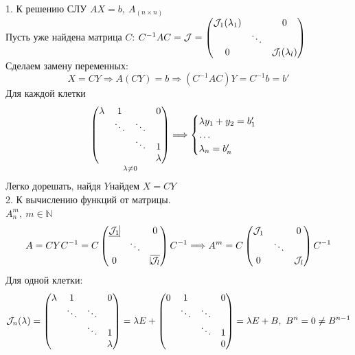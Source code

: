 \documentclass[a4paper, 12pt]{article}
\theoremstyle{definition}
\begin{document}
    1. К решению СЛУ $AX = b,\ A_{(n\times n)}$\\
    Пусть уже найдена матрица $C$: $C^{-1}AC = \mathcal{J} =
    \begin{pmatrix}
        \mathcal{J}_1(\lambda_1) & \null & 0\\
        \null & \ddots & \null\\
        0 & \null & \mathcal{J}_l(\lambda_l) 
    \end{pmatrix}$\\
    Сделаем замену переменных: $$X = CY \Longrightarrow 
    A(CY) = b \Longrightarrow (C^{-1}AC)Y = C^{-1}b = b'$$
    Для каждой клетки $$\underset{\lambda \neq 0}{\begin{pmatrix}
        \lambda & 1 & \null & 0\\
        \null & \ddots & \ddots & \null\\
        \null & \null & \ddots & 1\\
        \null & \null & \null & \lambda
    \end{pmatrix}} \Longrightarrow 
    \begin{cases}
        \lambda y_1 + y_2 = b_1'\\
        \dots\\
        \lambda_n = b_n'
    \end{cases}$$ $\text{Легко дорешать, найдя } Y \text{
    найдем } X = CY$\\
    2. К вычислению функций от матрицы.\\
    $A_n^m,\ m \in \mathbb{N}$ $$
    A = CYC^{-1} = C \begin{pmatrix}
        \underline{\mathcal{J}_1}\vline & \null & 0\\
        \null & \ddots & \null\\
        0 & \null & \overline{\vline \mathcal{J}_l}
    \end{pmatrix}C^{-1} \Longrightarrow A^m = C\begin{pmatrix}
        \mathcal{J}_1 & \null & 0\\
        \null & \ddots & \null\\
        0 & \null & \mathcal{J}_l
    \end{pmatrix}C^{-1}$$
    Для одной клетки:
    $$\mathcal{J}_n(\lambda) = \begin{pmatrix}
        \lambda & 1 & \null & 0\\
        \null & \ddots & \ddots & \null\\
        \null & \null & \ddots & 1\\
        \null & \null & \null & \lambda
    \end{pmatrix} = \lambda E + 
    \begin{pmatrix}
        0 & 1 & \null & 0\\
        \null & \ddots & \ddots & \null\\
        \null & \null & \ddots & 1\\
        \null & \null & \null & 0
    \end{pmatrix} = \lambda E + B,\ B^n = 0 \neq B^{n-1}$$
\end{document}
